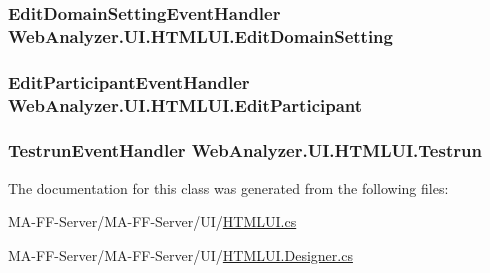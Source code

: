 \subsubsection[{Edit\+Domain\+Setting}]{\setlength{\rightskip}{0pt plus 5cm}Edit\+Domain\+Setting\+Event\+Handler Web\+Analyzer.\+U\+I.\+H\+T\+M\+L\+U\+I.\+Edit\+Domain\+Setting}\label{class_web_analyzer_1_1_u_i_1_1_h_t_m_l_u_i_aec067a24868c0ce06c3dd5ca4caccd8b}
\hypertarget{class_web_analyzer_1_1_u_i_1_1_h_t_m_l_u_i_a41d7bba18de0e030779e1bc57de9d267}{}
\subsubsection[{Edit\+Participant}]{\setlength{\rightskip}{0pt plus 5cm}Edit\+Participant\+Event\+Handler Web\+Analyzer.\+U\+I.\+H\+T\+M\+L\+U\+I.\+Edit\+Participant}\label{class_web_analyzer_1_1_u_i_1_1_h_t_m_l_u_i_a41d7bba18de0e030779e1bc57de9d267}
\hypertarget{class_web_analyzer_1_1_u_i_1_1_h_t_m_l_u_i_adb77cf3b6fe81466fc13561570764024}{}
\subsubsection[{Testrun}]{\setlength{\rightskip}{0pt plus 5cm}Testrun\+Event\+Handler Web\+Analyzer.\+U\+I.\+H\+T\+M\+L\+U\+I.\+Testrun}\label{class_web_analyzer_1_1_u_i_1_1_h_t_m_l_u_i_adb77cf3b6fe81466fc13561570764024}


The documentation for this class was generated from the following files\+:\begin{DoxyCompactItemize}
\item 
M\+A-\/\+F\+F-\/\+Server/\+M\+A-\/\+F\+F-\/\+Server/\+U\+I/\hyperlink{_h_t_m_l_u_i_8cs}{H\+T\+M\+L\+U\+I.\+cs}\item 
M\+A-\/\+F\+F-\/\+Server/\+M\+A-\/\+F\+F-\/\+Server/\+U\+I/\hyperlink{_h_t_m_l_u_i_8_designer_8cs}{H\+T\+M\+L\+U\+I.\+Designer.\+cs}\end{DoxyCompactItemize}
